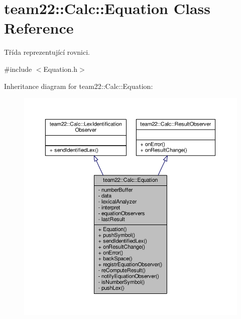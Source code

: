 \hypertarget{classteam22_1_1_calc_1_1_equation}{}\section{team22\+:\+:Calc\+:\+:Equation Class Reference}
\label{classteam22_1_1_calc_1_1_equation}


Třída reprezentující rovnici.  




{\ttfamily \#include $<$Equation.\+h$>$}



Inheritance diagram for team22\+:\+:Calc\+:\+:Equation\+:
\nopagebreak
\begin{figure}[H]
\begin{center}
\leavevmode
\includegraphics[width=350pt]{classteam22_1_1_calc_1_1_equation__inherit__graph}
\end{center}
\end{figure}


